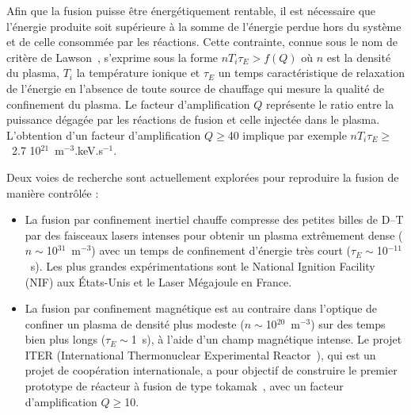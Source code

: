 \begin{refsection}
Afin que la fusion puisse être énergétiquement rentable, il est nécessaire
que l’énergie produite soit supérieure à la somme de l’énergie perdue hors du
système et de celle consommée par les réactions. Cette contrainte, connue sous
le nom de critère de Lawson~\parencite{Lawson}, s'exprime sous la forme
$nT_i\tau_E>f(Q)$ où $n$ est la densité du plasma, $T_i$ la température ionique
et $\tau_E$ un temps caractéristique de relaxation de l'énergie en l'absence de
toute source de chauffage qui mesure la qualité de confinement du plasma. Le
facteur d'amplification $Q$ représente le ratio entre la puissance dégagée par
les réactions de fusion et celle injectée dans le plasma. L'obtention d'un
facteur d'amplification $Q\geq$40 implique par exemple $nT_i\tau_E\geq$~2.7
10$^{21}$~m$^{-3}$.keV.s$^{-1}$.

Deux voies de recherche sont actuellement explorées
pour reproduire la fusion de manière contrôlée :

\begin{itemize}
	\item La fusion par confinement inertiel chauffe compresse des petites
	billes de D--T par des faisceaux lasers intenses pour obtenir un plasma
	extrêmement dense ($n\sim$10$^{31}$~m$^{-3}$) avec un temps de confinement
	d'énergie très court ($\tau_E\sim$10$^{-11}$~s). Les plus grandes
	expérimentations sont le National Ignition Facility (NIF) aux États-Unis et le
	Laser Mégajoule en France.
	\item La fusion par confinement magnétique est au contraire dans l'optique de
	confiner un plasma de densité plus modeste ($n\sim$10$^{20}$~m$^{-3}$) sur des
	temps bien plus longs ($\tau_E\sim$1~s), à l'aide d'un champ magnétique
	intense. Le projet ITER (International Thermonuclear
	Experimental Reactor~\parencite{ITER}), qui est un projet de coopération
	internationale, a pour objectif de construire le premier prototype de
	réacteur à fusion de type tokamak~\parencite{Wesson}, avec un facteur d'amplification
	$Q\geq$10.
\end{itemize}


\end{refsection}
